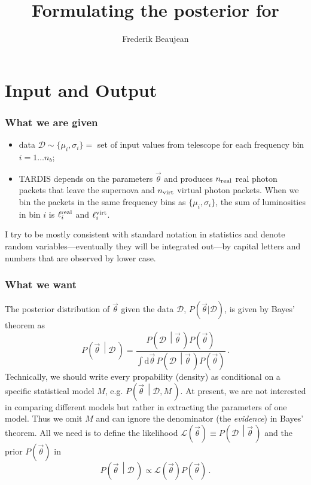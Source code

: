 \documentclass[a4,12pt]{article}
\title{Formulating the posterior for \tardis}
\author{Frederik Beaujean}
\newcommand{\data}{\ensuremath{\mathcal{D}}}
\newcommand{\expin}{\ensuremath{\lbrace\mu_i, \sigma_i\rbrace}}
\newcommand{\given}[2]{\left(#1\, \middle| #2 \, \right)}
\newcommand{\likelihood}{\ensuremath{\mathcal{L}}}
\newcommand{\lumi}{\ensuremath{\ell_i}}
\newcommand{\real}{\ensuremath{{\rm real}}}
\newcommand{\virt}{\ensuremath{{\rm virt}}}
\newcommand{\rmdx}[1]{\mbox{d} #1 \,} %
\newcommand{\vecth}{\ensuremath{{\vec{\theta}}}}
\newcommand{\tardis}{TARDIS}
\begin{document}
\maketitle

\section{Input and Output}

\subsubsection*{What we are given}
\begin{itemize}
\item data $\data \sim \expin =$ set of input values from
  telescope for each frequency bin $i=1 \dots n_b$;
\item \tardis{} depends on the parameters $\vecth$ and
  produces $n_\real$ real photon packets that leave the supernova and
  $n_\virt$ virtual photon packets. When we bin the packets in the same
  frequency bins as \expin, the sum of luminosities in bin $i$ is
  $\lumi^\real$ and $\lumi^\virt$.
\end{itemize}
I try to be mostly consistent with standard notation in statistics and
denote random variables---eventually they will be integrated out---by
capital letters and numbers that are observed by lower case.

\subsubsection*{What we want}
The posterior distribution of $\vecth$ given the data $\data$,
$P(\vecth | \data)$, is given by  Bayes' theorem as
\begin{equation}
  \label{eq:Bayes-full}
  P\given{\vecth}{\data} = \frac{P\given{\data}{\vecth} P(\vecth)}{\int \rmdx{\vecth} P\given{\data}{\vecth} P(\vecth)} \,.
\end{equation}
Technically, we should write every propability (density) as
conditional on a specific statistical model $M$,
e.g. $P\given{\vecth}{\data, M}$.  At present, we are not interested
in comparing different models but rather in extracting the parameters
of one model. Thus we omit $M$ and can ignore the denominator (the
\emph{evidence}) in Bayes' theorem. All we need is to define the
likelihood $\likelihood(\vecth) \equiv P\given{\data}{\vecth}$ and the
prior $P(\vecth)$ in
\begin{equation}
  \label{eq:Bayes-simple}
  P\given{\vecth}{\data} \propto \likelihood(\vecth) P(\vecth) \,.
\end{equation}
\end{document}
